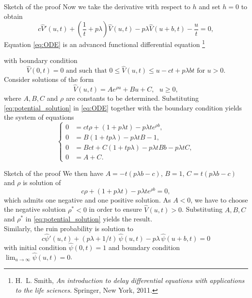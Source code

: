 \documentclass{beamer}
\newcommand\blfootnote[1]{%
  \begingroup
  \renewcommand\thefootnote{}\footnote{#1}%
  \addtocounter{footnote}{-1}%
  \endgroup
}
\begin{document}
\begin{frame}{Sketch of the proof}
\scriptsize
Now we take the derivative with respect to $h$ and set $h=0$ to obtain
\begin{equation}\label{eq:ODE}
c\widehat{V}'(u,t) + \left(\frac{1}{t} +  p\lambda\right)\widehat{V}(u,t) - p\lambda \widehat{V}(u+b,t) - \frac{u}{t} =0,
\end{equation}
Equation \eqref{eq:ODE} is an advanced functional differential equation\blfootnote{\tiny 
 H.~L. Smith, {\em An introduction to delay differential equations with
  applications to the life sciences}.
\newblock Springer, New York, 2011.
}
with boundary condition 
$$
\widehat{V}(0,t) = 0 \text{ and such that } 0\leq \widehat{V}(u,t)\leq u-ct+p\lambda b t \text{ for }u>0.
$$  
Consider solutions of the form 
\begin{equation}\label{eq:potential_solution}
\widehat{V}(u,t) = Ae^{\rho u }+Bu + C,\text{ }u \ge 0, 
\end{equation}
where $A, B,C$ and $\rho$ are constants to be determined. Substituting \eqref{eq:potential_solution} in \eqref{eq:ODE} together with the boundary condition yields the system of equations 
\begin{equation*}
\begin{cases}
0&=ct\rho + \left(1+p\lambda t\right)-p\lambda te^{\rho b}, \\
0&= B\left(1+tp\lambda\right)-p\lambda tB - 1,\\
0&=Bct+C(1+tp\lambda) - p\lambda t Bb-p\lambda tC, \\
0&=A+C.
\end{cases}
\end{equation*}
\end{frame}
\begin{frame}{Sketch of the proof}
\scriptsize
We then have $A = -t(p\lambda b - c)$, $B = 1$, $C = t(p\lambda b - c)$ and $\rho$ is solution of 
$$
c\rho + \left(1+p\lambda t\right)-p\lambda te^{\rho b} = 0,
$$
which admits one negative and one positive solution. As $A<0$, we have to choose the negative solution $\rho^\ast<0$ in order to ensure $\widehat{V}(u,t)>0$. Substituting $A,B,C$ and $\rho^{\ast}$ in \eqref{eq:potential_solution}  yields the result.\\

Similarly, the ruin probability is solution to 
\begin{equation*}\label{psii}
c\widehat{\psi}'(u,t)+(p \lambda+1/t)\,\widehat{\psi}(u,t)-p \lambda\,\widehat{\psi}(u+b,t)=0
\end{equation*}
with initial condition $\widehat{\psi}(0,t)=1$ and boundary condition $\lim_{u\to\infty}\widehat{\psi}(u,t)=0$.
\end{frame}
\end{document}
